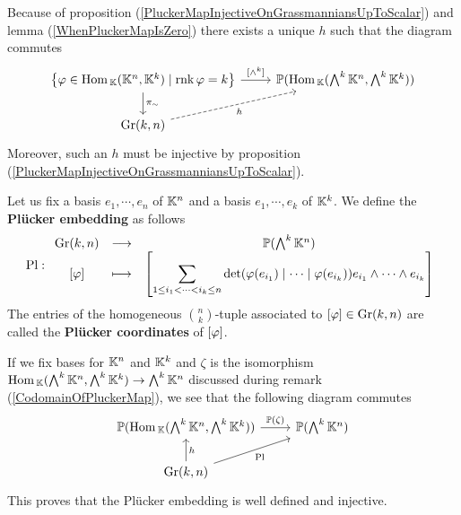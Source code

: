 \begin{remark}
Because of proposition (\ref{PluckerMapInjectiveOnGrassmanniansUpToScalar}) and lemma (\ref{WhenPluckerMapIsZero}) there exists a unique $h$ such that the diagram commutes
\[\begin{tikzcd}
	{\cpa{\vp\in \Hom_\K(\K^n,\K^k)\mid \rnk \vp=k}} & {\Pj(\Hom_\K(\bigwedge^k\K^n,\bigwedge^k\K^k))} \\
	{\Gr(k,n)}
	\arrow["\pi_\sim", from=1-1, to=2-1]
	\arrow["{[\wedge^k]}", from=1-1, to=1-2]
	\arrow["h"', dashed, from=2-1, to=1-2]
\end{tikzcd}\]
Moreover, such an $h$ must be injective by proposition (\ref{PluckerMapInjectiveOnGrassmanniansUpToScalar}).
\end{remark}


\begin{definition}
Let us fix a basis $e_1,\cdots, e_n$ of $\mathbb{K}^n$ and a basis $e_1,\cdots, e_k$ of $\mathbb{K}^k$. We define the \textbf{Pl\"ucker embedding} as follows
\[\mathrm{Pl}:\begin{array}{ccc} {\mathrm{Gr}(k,n)} & \longrightarrow & {\mathbb{P}(\bigwedge^k\mathbb{K}^n)}\\ {[\varphi]} & \longmapsto & {\displaystyle\left[{\sum_{1\leq i_1<\cdots<i_k\leq n}\det(\varphi(e_{i_1})\mid\cdots\mid\varphi(e_{i_k}))e_{i_1}\wedge\cdots\wedge e_{i_k}}\right]} \end{array}\]
The entries of the homogeneous $\binom nk$-tuple associated to $[\varphi]\in \mathrm{Gr}(k,n)$ are called the \textbf{Pl\"ucker coordinates} of $[\varphi]$. 
\end{definition}

\begin{remark}
If we fix bases for $\mathbb{K}^n$ and $\mathbb{K}^k$ and $\zeta$ is the isomorphism $\mathrm{Hom}\,_{\mathbb{K}}(\bigwedge^k\mathbb{K}^n,\bigwedge^k\mathbb{K}^k)\to \bigwedge^k\mathbb{K}^n$ discussed during remark (\ref{CodomainOfPluckerMap}), we see that the following diagram commutes
\[\begin{tikzcd}
	{\Pj(\Hom_\K(\bigwedge^k\K^n,\bigwedge^k\K^k))} & {\Pj(\bigwedge^k\K^n)} \\
	{\Gr(k,n)}
	\arrow["h"', from=2-1, to=1-1]
	\arrow["{\Pj(\zeta)}", from=1-1, to=1-2]
	\arrow["{\Pl}"', from=2-1, to=1-2]
\end{tikzcd}\]
This proves that the Pl\"ucker embedding is well defined and injective.
\end{remark}


